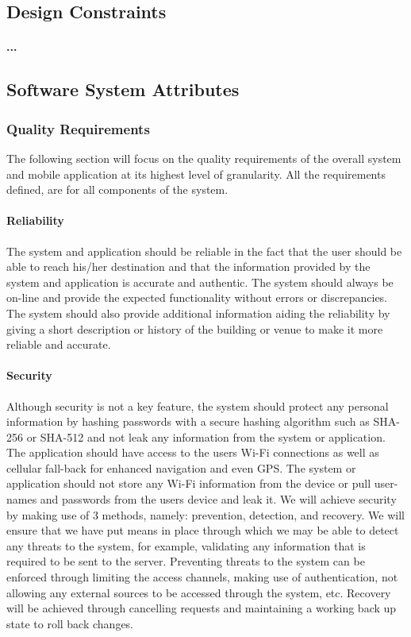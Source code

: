 \documentclass[runningheads,a4paper]{article}
\begin{document}
\subsection{Design Constraints}
\paragraph{...}

 
\subsection{Software System Attributes}
\subsubsection{Quality Requirements }
The following section will focus on the quality requirements of the overall system and mobile application at its highest level of granularity. All the requirements defined, are for all components of the system.

\paragraph{\textbf{Reliability}\\}
The system and application should be reliable in the fact that the user should be able to reach his/her destination and that the information provided by the system and application is accurate and authentic. The system should always be on-line and provide the expected functionality without errors or discrepancies. The system should also provide additional information aiding the reliability by giving a short description or history of the building or venue to make it more reliable and accurate. 

\paragraph{\textbf{Security}\\}
Although security is not a key feature, the system should protect any personal information by hashing passwords with a secure hashing algorithm such as SHA-256 or SHA-512 and not leak any information from the system or application. The application should have access to the users Wi-Fi connections as well as cellular fall-back for enhanced navigation and even GPS. The system or application should not store any Wi-Fi information from the device or pull user-names and passwords from the users device and leak it.
We will achieve security by making use of 3 methods, namely: prevention, detection, and recovery. We will ensure that we have put means in
place through which we may be able to detect any threats to the system,
for example, validating any information that is required to be sent to the
server. Preventing threats to the system can be enforced through limiting the access channels, making use of authentication, not allowing any
external sources to be accessed through the system, etc. Recovery will be
achieved through cancelling requests and maintaining a working back up
state to roll back changes.  
\end{document}
